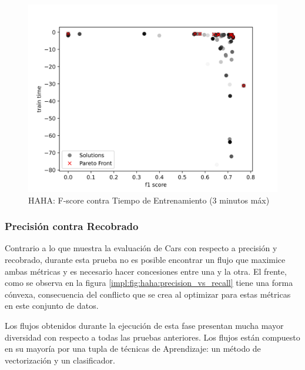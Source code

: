 \begin{figure}[ht]
    \centering
    \includegraphics[scale=0.65]{Pictures/haha_fscore_vs_time_3min.jpg}
    \caption{HAHA: F-score contra Tiempo de Entrenamiento (3 minutos m\'ax)}
    \label{impl:fig:haha:fscore_vs_time_3min}
\end{figure}

\subsubsection{Precisi\'on contra Recobrado}
Contrario a lo que muestra la evaluaci\'on de Cars con respecto a precisi\'on y recobrado, durante esta prueba no es posible encontrar un flujo que maximice ambas m\'etricas y es necesario hacer concesiones entre una y la otra. El frente, como se observa en la figura \ref{impl:fig:haha:precision_vs_recall} tiene una forma c\'onvexa, consecuencia del conflicto que se crea al optimizar para estas m\'etricas en este conjunto de datos.

Los flujos obtenidos durante la ejecuci\'on de esta fase presentan mucha mayor diversidad con respecto a todas las pruebas anteriores. Los flujos est\'an compuesto en su mayor\'ia por una tupla de t\'ecnicas de Aprendizaje: un m\'etodo de vectorizaci\'on y un clasificador.

